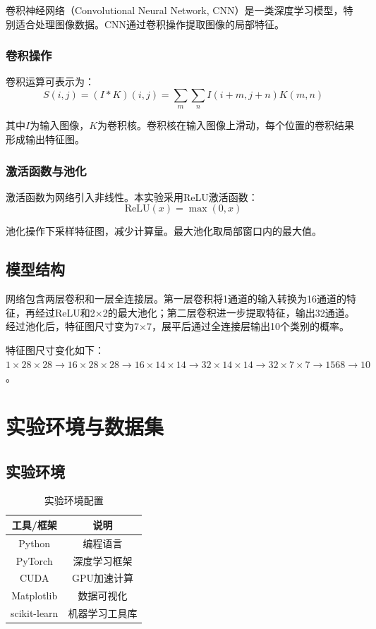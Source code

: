 \documentclass[12pt,a4paper]{article}
\begin{document}
卷积神经网络（Convolutional Neural Network, CNN）是一类深度学习模型，特别适合处理图像数据。CNN通过卷积操作提取图像的局部特征。

\subsubsection{卷积操作}

卷积运算可表示为：
\begin{equation}
S(i,j) = (I * K)(i,j) = \sum_m \sum_n I(i+m, j+n) K(m,n)
\end{equation}

其中$I$为输入图像，$K$为卷积核。卷积核在输入图像上滑动，每个位置的卷积结果形成输出特征图。

\subsubsection{激活函数与池化}

激活函数为网络引入非线性。本实验采用ReLU激活函数：
\begin{equation}
\text{ReLU}(x) = \max(0, x)
\end{equation}

池化操作下采样特征图，减少计算量。最大池化取局部窗口内的最大值。

\subsection{模型结构}

网络包含两层卷积和一层全连接层。第一层卷积将1通道的输入转换为16通道的特征，再经过ReLU和2×2的最大池化；第二层卷积进一步提取特征，输出32通道。经过池化后，特征图尺寸变为7×7，展平后通过全连接层输出10个类别的概率。

特征图尺寸变化如下：$1 \times 28 \times 28 \to 16 \times 28 \times 28 \to 16 \times 14 \times 14 \to 32 \times 14 \times 14 \to 32 \times 7 \times 7 \to 1568 \to 10$。

\section{实验环境与数据集}

\subsection{实验环境}

\begin{table}[H]
\centering
\begin{tabular}{cc}
\toprule
工具/框架 & 说明 \\
\midrule
Python & 编程语言 \\
PyTorch & 深度学习框架 \\
CUDA & GPU加速计算 \\
Matplotlib & 数据可视化 \\
scikit-learn & 机器学习工具库 \\
\bottomrule
\end{tabular}
\caption{实验环境配置}
\label{tab:environment}
\end{table}
\end{document}
